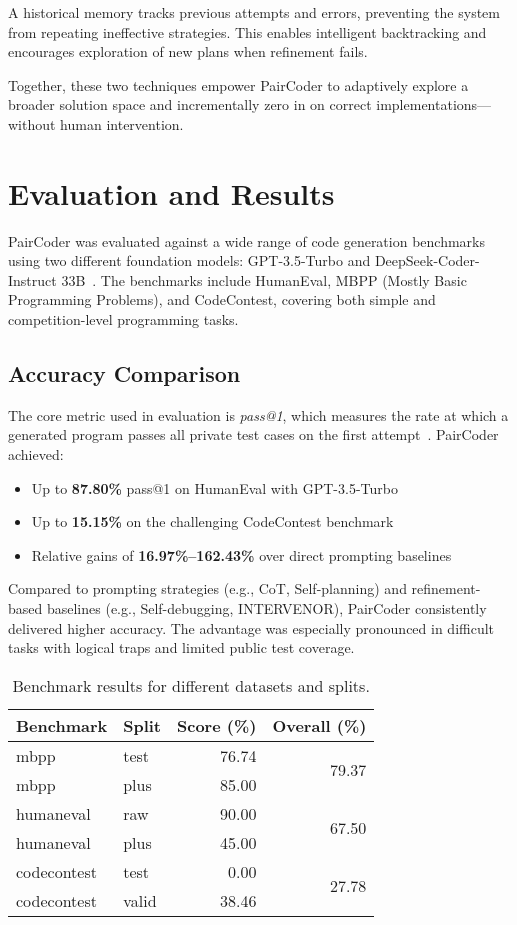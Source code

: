 \documentclass[11pt,a4paper]{article}
\begin{document}
A historical memory tracks previous attempts and errors, preventing the system from repeating ineffective strategies. This enables intelligent backtracking and encourages exploration of new plans when refinement fails.

Together, these two techniques empower PairCoder to adaptively explore a broader solution space and incrementally zero in on correct implementations—without human intervention.
\section{Evaluation and Results}
PairCoder was evaluated against a wide range of code generation benchmarks using two different foundation models: GPT-3.5-Turbo and DeepSeek-Coder-Instruct 33B~\cite{zhang2024paircoder}. The benchmarks include HumanEval, MBPP (Mostly Basic Programming Problems), and CodeContest, covering both simple and competition-level programming tasks.

\subsection{Accuracy Comparison}
The core metric used in evaluation is \textit{pass@1}, which measures the rate at which a generated program passes all private test cases on the first attempt~\cite{zhang2024paircoder}. PairCoder achieved:
\begin{itemize}
\item Up to \textbf{87.80\%} pass@1 on HumanEval with GPT-3.5-Turbo
\item Up to \textbf{15.15\%} on the challenging CodeContest benchmark
\item Relative gains of \textbf{16.97\%–162.43\%} over direct prompting baselines
\end{itemize}

Compared to prompting strategies (e.g., CoT, Self-planning) and refinement-based baselines (e.g., Self-debugging, INTERVENOR), PairCoder consistently delivered higher accuracy. The advantage was especially pronounced in difficult tasks with logical traps and limited public test coverage.


\begin{table}[h]
\centering
\begin{tabular}{l l r r}
  \toprule
  \textbf{Benchmark} & \textbf{Split} & \textbf{Score (\%)} & \textbf{Overall (\%)} \\
  \midrule
  mbpp        & test  & 76.74 & \multirow{2}{*}{79.37} \\
  mbpp        & plus  & 85.00 & \\
  \midrule
  humaneval   & raw   & 90.00 & \multirow{2}{*}{67.50} \\
  humaneval   & plus  & 45.00 & \\
  \midrule
  codecontest & test  &  0.00 & \multirow{2}{*}{27.78} \\
  codecontest & valid & 38.46 & \\
  \bottomrule
\end{tabular}
\caption{Benchmark results for different datasets and splits.}
\label{tab:benchmark_results}
\end{table}
\end{document}
